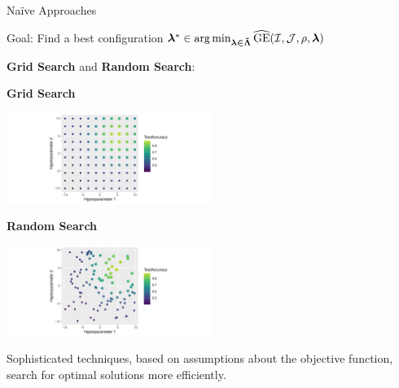 \documentclass[11pt,compress,t,notes=noshow, xcolor=table]{beamer}
\begin{document}
\begin{vbframe}{Naïve Approaches}

Goal: Find a best configuration $\bm{\lambda}^{*} \in \operatorname{arg\,min} \limits_{\boldsymbol{\lambda \in \tilde{\bm{\Lambda}}}} \widehat{\mathrm{GE}}(\mathcal{I}, \mathcal{J}, \rho, \bm{\lambda}) $

\textbf{Grid Search} and \textbf{Random Search}:

\vspace{2em}
\begin{minipage}{0.51\textwidth}
\begin{center}
\textbf{Grid Search}
\end{center}

\includegraphics[width=190pt]{figure/cart_tuning_balgos_1.pdf}
\end{minipage}
\begin{minipage}{0.48\textwidth}
\begin{center}
\textbf{Random Search}
\end{center}

\includegraphics[width=190pt]{figure/cart_tuning_balgos_2.pdf}
\end{minipage}

\vspace{5em}
\small Sophisticated techniques, based on assumptions about the objective function, search for optimal solutions more efficiently.
\end{vbframe}
\end{document}
